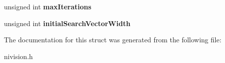 \begin{DoxyCompactItemize}
\item 
\hypertarget{structDataMatrixSearchOptions__struct_a54912320e59539d026ded707edb66ec5}{
unsigned int {\bfseries maxIterations}}
\label{structDataMatrixSearchOptions__struct_a54912320e59539d026ded707edb66ec5}

\item 
\hypertarget{structDataMatrixSearchOptions__struct_a65dab3cbd45a4a6c351c1b628867327a}{
unsigned int {\bfseries initialSearchVectorWidth}}
\label{structDataMatrixSearchOptions__struct_a65dab3cbd45a4a6c351c1b628867327a}

\end{DoxyCompactItemize}


The documentation for this struct was generated from the following file:\begin{DoxyCompactItemize}
\item 
nivision.h\end{DoxyCompactItemize}
